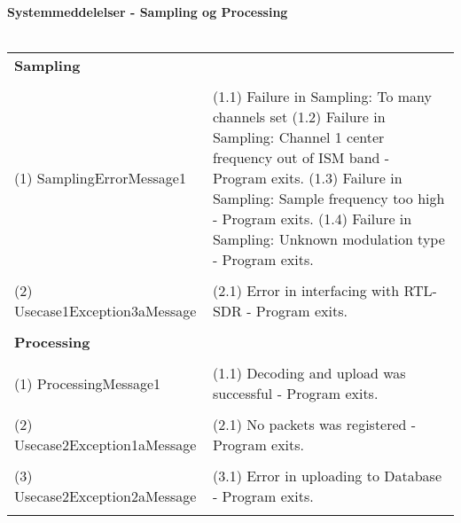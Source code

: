\begin{appendices}
\textbf{Systemmeddelelser - Sampling og Processing} \\ \\
\begin{tabular}{ p{6cm} | p{6cm} }
	\textbf{Sampling} 		        & \\ \\
	(1) SamplingErrorMessage1	    & (1.1) Failure in Sampling: To many channels set \newline \newline (1.2) Failure in Sampling: Channel 1 center frequency out of ISM band - Program exits. \newline \newline (1.3) Failure in Sampling: Sample frequency too high - Program exits. \newline \newline (1.4) Failure in Sampling: Unknown modulation type - Program exits. \\ \\
	(2) Usecase1Exception3aMessage  & (2.1) Error in interfacing with RTL-SDR - Program exits. \\ \\
	
	
	\textbf{Processing} 	        & \\ \\
	(1) ProcessingMessage1		    & (1.1) Decoding and upload was successful - Program exits. \\ \\
	(2) Usecase2Exception1aMessage  & (2.1) No packets was registered - Program exits. \\ \\
	(3) Usecase2Exception2aMessage  & (3.1) Error in uploading to Database - Program exits. \\ \\
\end{tabular}  


\end{appendices}

